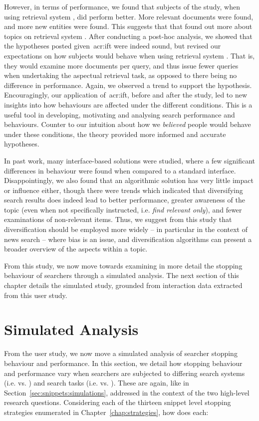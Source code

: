 However, in terms of performance, we found that subjects of the study, when using retrieval system , did perform better. More relevant documents were found, and more new entities were found. This suggests that that found out more about topics on retrieval system . After conducting a post-hoc analysis, we showed that the hypotheses posted given~\gls{acr:ift} were indeed sound, but revised our expectations on how subjects would behave when using retrieval system . That is, they would examine more documents per query, and thus issue fewer queries when undertaking the aspectual retrieval task, as opposed to there being no difference in performance. Again, we observed a trend to support the hypothesis. Encouragingly, our application of~\gls{acr:ift}, before and after the study, led to new insights into how behaviours are affected under the different conditions. This is a useful tool in developing, motivating and analysing search performance and behaviours. Counter to our intuition about how we \emph{believed} people would behave under these conditions, the theory provided more informed and accurate hypotheses.

In past work, many interface-based solutions were studied, where a few significant differences in behaviour were found when compared to a standard interface. Disappointingly, we also found that an algorithmic solution has very little impact or influence either, though there were trends which indicated that diversifying search results does indeed lead to better performance, greater awareness of the topic (even when not specifically instructed, i.e. \emph{find relevant only}), and fewer examinations of non-relevant items. Thus, we suggest from this study that diversification should be employed more widely -- in particular in the context of news search -- where bias is an issue, and diversification algorithms can present a broader overview of the aspects within a topic.

From this study, we now move towards examining in more detail the stopping behaviour of searchers through a simulated analysis. The next section of this chapter details the simulated study, grounded from interaction data extracted from this user study.

\section{Simulated Analysis}\label{sec:diversity:simulated}
From the user study, we now move a simulated analysis of searcher stopping behaviour and performance. In this section, we detail how stopping behaviour and performance vary when searchers are subjected to differing search systems (i.e.  vs. ) and search tasks (i.e.  vs. ). These are again, like in Section~\ref{sec:snippets:simulations}, addressed in the context of the two high-level research questions. Considering each of the thirteen snippet level stopping strategies enumerated in Chapter~\ref{chap:strategies}, how does each:

